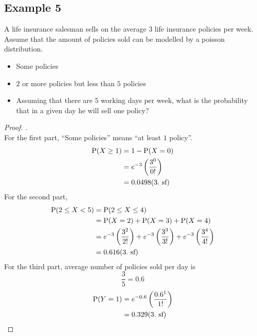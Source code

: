 \documentclass[../setup.tex]{subfiles}
\begin{document}
\subsection{Example 5}
\begin{example}
A life insurance salesman sells on the average $3$ life insurance policies per week. Assume that the amount of policies sold can be modelled by a poisson distribution.
\begin{itemize}
	\item Some policies
	\item $2$ or more policies but less than $5$ policies
	\item Assuming that there are $5$ working days per week, what is the probability that in a given day he will sell one policy?
\end{itemize}
\end{example}
\begin{proof} . \\
For the first part, ``Some policies'' means ``at least $1$ policy''. 
\begin{align*}
\textup{P}(X\geq1) &= 1 - \textup{P}(X=0) \\
&= e^{-3}\left(\frac{3^0}{0!}\right) \\
&= 0.0498 (3. \text{ sf})
\end{align*}
For the second part,
\begin{align*}
\textup{P}(2\leq X < 5) &= \textup{P}(2\leq X\leq4) \\
&= \textup{P}(X=2) + \textup{P}(X=3) + \textup{P}(X=4) \\
&= e^{-3}\left(\frac{3^2}{2!}\right) + e^{-3}\left(\frac{3^3}{3!}\right) + e^{-3}\left(\frac{3^4}{4!}\right) \\
&= 0.616 (3. \text{ sf})
\end{align*}
For the third part, average number of policies sold per day is $$\frac{3}{5} = 0.6$$
\begin{align*}
\textup{P}(Y=1) &= e^{-0.6}\left(\frac{0.6^1}{1!}\right) \\
&= 0.329 (3. \text{ sf})
\end{align*}
\end{proof}
\clearpage
\end{document}
